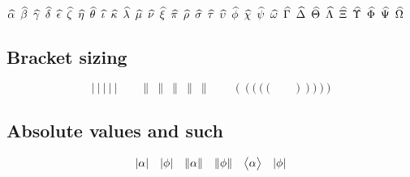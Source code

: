 \documentclass[noaddress, tikz]{nmd-article}
\newcommand{\sizetest}[1]{%
  #1 \ \big#1 \ \Big#1 \ \bigg#1 \ \Bigg#1 %
}
\begin{document}
$\alphahat \enskip \betahat \enskip \gammahat \enskip \deltahat \enskip \epsilonhat \enskip \zetahat \enskip \etahat \enskip \thetahat \enskip \iotahat \enskip \kappahat \enskip \lambdahat \enskip \muhat \enskip \nuhat \enskip \xihat \enskip \pihat \enskip \rhohat \enskip \sigmahat \enskip \tauhat \enskip \upsilonhat \enskip \phihat \enskip \chihat \enskip \psihat \enskip \omegahat \enskip \Gammahat \enskip \Deltahat \enskip \Thetahat \enskip \Lambdahat \enskip \Xihat \enskip \Upsilonhat \enskip \Phihat \enskip \Psihat \enskip \Omegahat$

\subsection*{Bracket sizing}

\[
\sizetest{|} \qquad \sizetest{\|}  \qquad \sizetest{(} \qquad \sizetest{)}
\]

\subsection*{Absolute values and such}

\[
{\left| \alpha \right|} \quad {\left| \phi \right|} \quad {\left\| \alpha \right\|} \quad {\| \phi \|}
\quad {\big\langle \alpha \big\rangle} \quad {| \phi |}
\]


{\RaggedRight 
 

}
\end{document}
